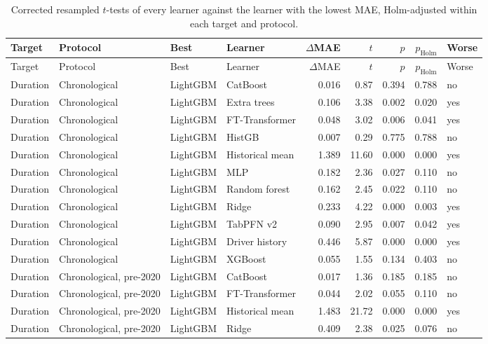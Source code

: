 {\scriptsize\begin{longtable}{llllrrrrl}
\caption{Corrected resampled $t$-tests of every learner against the learner with the lowest MAE, Holm-adjusted within each target and protocol.}\label{tab:s-pairwise}\\
\toprule
Target & Protocol & Best & Learner & $\Delta$MAE & $t$ & $p$ & $p_{\text{Holm}}$ & Worse \\
\midrule
\endfirsthead
\toprule
Target & Protocol & Best & Learner & $\Delta$MAE & $t$ & $p$ & $p_{\text{Holm}}$ & Worse \\
\midrule
\endhead
\bottomrule
\endfoot
Duration & Chronological & LightGBM & CatBoost & 0.016 & 0.87 & 0.394 & 0.788 & no \\
Duration & Chronological & LightGBM & Extra trees & 0.106 & 3.38 & 0.002 & 0.020 & yes \\
Duration & Chronological & LightGBM & FT-Transformer & 0.048 & 3.02 & 0.006 & 0.041 & yes \\
Duration & Chronological & LightGBM & HistGB & 0.007 & 0.29 & 0.775 & 0.788 & no \\
Duration & Chronological & LightGBM & Historical mean & 1.389 & 11.60 & 0.000 & 0.000 & yes \\
Duration & Chronological & LightGBM & MLP & 0.182 & 2.36 & 0.027 & 0.110 & no \\
Duration & Chronological & LightGBM & Random forest & 0.162 & 2.45 & 0.022 & 0.110 & no \\
Duration & Chronological & LightGBM & Ridge & 0.233 & 4.22 & 0.000 & 0.003 & yes \\
Duration & Chronological & LightGBM & TabPFN v2 & 0.090 & 2.95 & 0.007 & 0.042 & yes \\
Duration & Chronological & LightGBM & Driver history & 0.446 & 5.87 & 0.000 & 0.000 & yes \\
Duration & Chronological & LightGBM & XGBoost & 0.055 & 1.55 & 0.134 & 0.403 & no \\
Duration & Chronological, pre-2020 & LightGBM & CatBoost & 0.017 & 1.36 & 0.185 & 0.185 & no \\
Duration & Chronological, pre-2020 & LightGBM & FT-Transformer & 0.044 & 2.02 & 0.055 & 0.110 & no \\
Duration & Chronological, pre-2020 & LightGBM & Historical mean & 1.483 & 21.72 & 0.000 & 0.000 & yes \\
Duration & Chronological, pre-2020 & LightGBM & Ridge & 0.409 & 2.38 & 0.025 & 0.076 & no \\

\end{longtable}}
